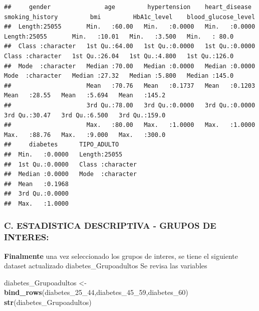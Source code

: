 \documentclass[
]{article}
\newenvironment{Shaded}{\begin{snugshade}}{\end{snugshade}}
\newcommand{\FunctionTok}[1]{\textcolor[rgb]{0.13,0.29,0.53}{\textbf{#1}}}
\newcommand{\NormalTok}[1]{#1}
\newcommand{\OtherTok}[1]{\textcolor[rgb]{0.56,0.35,0.01}{#1}}
\begin{document}
\begin{verbatim}
##     gender               age         hypertension    heart_disease    smoking_history         bmi         HbA1c_level    blood_glucose_level
##  Length:25055       Min.   :60.00   Min.   :0.0000   Min.   :0.0000   Length:25055       Min.   :10.01   Min.   :3.500   Min.   : 80.0      
##  Class :character   1st Qu.:64.00   1st Qu.:0.0000   1st Qu.:0.0000   Class :character   1st Qu.:26.04   1st Qu.:4.800   1st Qu.:126.0      
##  Mode  :character   Median :70.00   Median :0.0000   Median :0.0000   Mode  :character   Median :27.32   Median :5.800   Median :145.0      
##                     Mean   :70.76   Mean   :0.1737   Mean   :0.1203                      Mean   :28.55   Mean   :5.694   Mean   :145.2      
##                     3rd Qu.:78.00   3rd Qu.:0.0000   3rd Qu.:0.0000                      3rd Qu.:30.47   3rd Qu.:6.500   3rd Qu.:159.0      
##                     Max.   :80.00   Max.   :1.0000   Max.   :1.0000                      Max.   :88.76   Max.   :9.000   Max.   :300.0      
##     diabetes      TIPO_ADULTO       
##  Min.   :0.0000   Length:25055      
##  1st Qu.:0.0000   Class :character  
##  Median :0.0000   Mode  :character  
##  Mean   :0.1968                     
##  3rd Qu.:0.0000                     
##  Max.   :1.0000
\end{verbatim}

\hypertarget{c.-estadistica-descriptiva---grupos-de-interes}{%
\subsubsection{\texorpdfstring{\textbf{C. ESTADISTICA DESCRIPTIVA -
GRUPOS DE
INTERES:}}{C. ESTADISTICA DESCRIPTIVA - GRUPOS DE INTERES:}}\label{c.-estadistica-descriptiva---grupos-de-interes}}

\textbf{Finalmente} una vez seleccionado los grupos de interes, se tiene
el siguiente dataset actualizado diabetes\_Grupoadultos Se revisa las
variables

\begin{Shaded}
\begin{Highlighting}[]
\NormalTok{diabetes\_Grupoadultos }\OtherTok{\textless{}{-}} \FunctionTok{bind\_rows}\NormalTok{(diabetes\_25\_44,diabetes\_45\_59,diabetes\_60)}
\FunctionTok{str}\NormalTok{(diabetes\_Grupoadultos)}
\end{Highlighting}
\end{Shaded}
\end{document}
